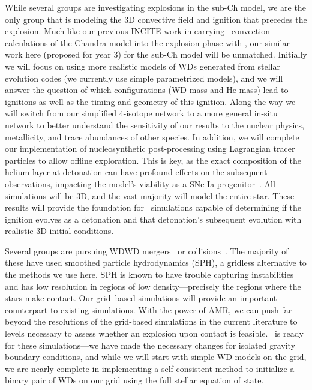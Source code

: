 \documentclass[11pt,letterpaper,english]{article}
\begin{document}
While several groups are investigating explosions in the sub-Ch model,
we are the only group that is modeling the 3D convective field and
ignition that precedes the explosion.  Much like our previous INCITE
work in carrying \maestro\ convection calculations of the Chandra
model into the explosion phase with \castro, our similar work here
(proposed for year 3) for the sub-Ch model will be unmatched.
Initially we will focus on using more realistic models of WDs
generated from stellar evolution codes (we currently use simple
parametrized models), and we will answer the question of which
configurations (WD mass and He mass) lead to ignitions as well as the
timing and geometry of this ignition.  Along the way we will switch
from our simplified 4-isotope network to a more general in-situ
network to better understand the sensitivity of our results to the
nuclear physics, metallicity, and trace abundances of other species.
In addition, we will complete our implementation of nucleosynthetic
post-processing using Lagrangian tracer particles to allow offline
exploration.  This is key, as the exact composition of the helium
layer at detonation can have profound effects on the subsequent
observations, impacting the model's viability as a SNe Ia
progenitor~\cite{kromer:2010}.  All simulations will be 3D, and the
vast majority will model the entire star.  These results will provide
the foundation for \castro\ simulations capable of determining if the
ignition evolves as a detonation and that detonation's subsequent
evolution with realistic 3D initial conditions.
 
Several groups are pursuing WDWD 
mergers~\cite{yoon:2007,motl:2007,loren-aguilar:2009,shenetal+11} or
collisions~\cite{raskinetal+10,loren-aguilar:2010,rosswog:2009}. The
majority of these have used smoothed particle hydrodynamics (SPH), a
gridless alternative to the methods we use here.  SPH is known to have
trouble capturing instabilities and has low resolution in regions of
low density---precisely the regions where the stars make contact.  Our
grid--based simulations will provide an important counterpart to
existing simulations.  With the power of AMR, we can push far beyond
the resolutions of the grid-based simulations in the current
literature to levels necessary to assess whether an explosion upon
contact is feasible. \castro\ is ready for these simulations---we have
made the necessary changes for isolated gravity boundary conditions,
and while we will start with simple WD models on the grid, we are
nearly complete in implementing a self-consistent method to initialize a binary
pair of WDs on our grid using the full stellar equation of state.
\end{document}
